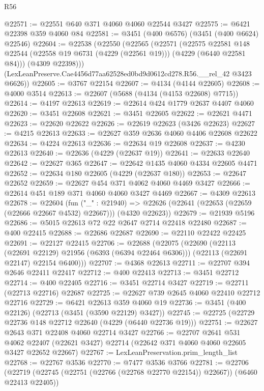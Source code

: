 \begin{lexlean}{R56}
\begin{coremodule}
@22571 := @22551 @640 @371 @4060 @4060 @22544 @3427
@22575 := @6421 @22398 @359 @4060 @84
@22581 := @3451 (@400 @6576) (@3451 (@400 @6624) @22546)
@22604 := @22538
    (@22550
      (@22565
        (@22571
          (@22575
            @22581
            @148
            @22544
            (@22558 @19 @6731 (@4229 (@22561 @19)))
            (@4229 (@6440 @22581 @84)))
          (@4309 @22398)))
      (LexLeanPreserve.Cae4456d77aa62528ed0bd9d0612cd278.R56.__rel_42 @3423 @6626))
@22605 := @3767 @22154
@22607 := @4134 (@4144 @22605)
@22608 := @4000 @3514
@22613 := @22607 (@5688 (@4134 (@4153 @22608) @7715))
@22614 := @4197 @22613
@22619 := @22614 @424 @1779 @2637 @4407 @4060
@22620 := @3451 @22608
@22621 := @3451 @22605
@22622 := @22621 @4471
@22623 := @22620 @22622
@22626 := @22619 @22623 (@3426 @22623)
@22627 := @4215 @22613
@22633 := @22627 @359 @2636 @4060 @4406 @22608 @22622
@22634 := @4224 @22613
@22636 := @22634 @19 @22608
@22637 := @4230 @22613
@22640 := @22636 (@4229 (@22637 @19))
@22641 := @22633 @22640
@22642 := @22627 @365
@22647 := @22642 @1435 @4060 @4334 @22605 @4471
@22652 := @22634 @180 @22605 (@4229 (@22637 @180))
@22653 := @22647 @22652
@22659 := @22627 @454 @371 @4062 @4060 @4469 @3427
@22666 := @22614 @451 @189 @371 @4060 @4060 @3427 @4469
@22667 := @4309 @22613
@22678 := @22604
    (fun ("_" : @21940) =>
    @22626 (@22641 (@22653 (@22659 (@22666 @22667 @4532) @22667))) (@4320 @22623))
@22679 := @21939 @5196
@22686 := @5015 @22613 @72 @22 @2647 @2714 @22418 @22480
@22687 := @400 @22415
@22688 := @22686 @22687
@22690 := @22110 @22422 @22425
@22691 := @22127 @22415
@22706 := @22688
    (@22075
      (@22690
        (@22113 (@22691 @22129) @21956 (@6393 (@6394 @22464 @6306)))
        (@22113 (@22691 @22147) @22154 @6400)))
@22707 := @4368 @22613
@22711 := @22707 @394 @2646 @22411 @22417
@22712 := @400 @22413
@22713 := @3451 @22712
@22714 := @400 @22405
@22716 := @3451 @22714 @3427
@22719 := @22711 (@22713 @22716) @22687
@22725 := @22627 @739 @2645 @4060 @22410 @22712 @22716
@22729 := @6421 @22613 @359 @4060 @19
@22736 := @3451 (@400 @22126) (@22713 (@3451 (@3590 @22129) @3427))
@22745 := @22725 (@22729 @22736 @148 @22712 @22640 (@4229 (@6440 @22736 @19)))
@22751 := @22627 @2643 @371 @22408 @4060 @22714 @3427
@22766 := @22707
    @2641
    @531
    @4062
    @22407
    (@22621 @3427)
    @22714
    (@22642 @371 @4060 @4060 @22605 @3427 @22652 @22667)
@22767 := LexLeanPreservation.prim_length_list
@22768 := @22767 @3536
@22770 := @7477 @3536 @3766
@22781 := @22706
    (@22719 (@22745 (@22751 (@22766 (@22768 @22770 @22154)) @22667)) (@6460 @22413 @22405))

\end{coremodule}
\end{lexlean}
